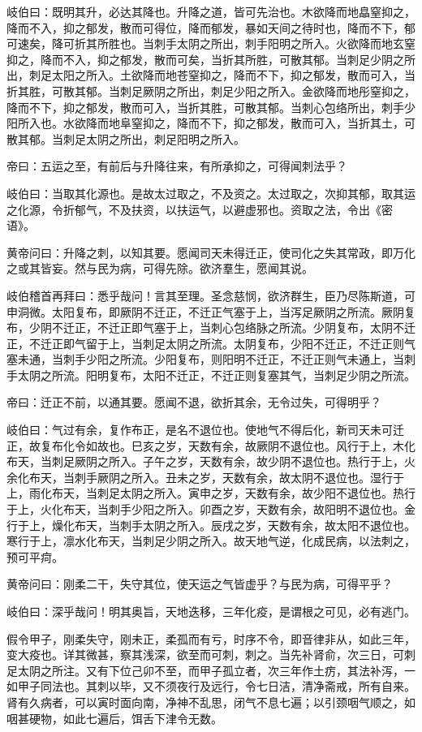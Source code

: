 \documentclass{article}%
\begin{document}
岐伯曰：既明其升，必达其降也。升降之道，皆可先治也。木欲降而地皛窒抑之，降而不入，抑之郁发，散而可得位，降而郁发，暴如天间之待时也，降而不下，郁可速矣，降可折其所胜也。当刺手太阴之所出，刺手阳明之所入。火欲降而地玄窒抑之，降而不入，抑之郁发，散而可矣，当折其所胜，可散其郁。当刺足少阴之所出，刺足太阳之所入。土欲降而地苍窒抑之，降而不下，抑之郁发，散而可入，当折其胜，可散其郁。当刺足厥阴之所出，刺足少阳之所入。金欲降而地彤窒抑之，降而不下，抑之郁发，散而可入，当折其胜，可散其郁。当刺心包络所出，刺手少阳所入也。水欲降而地阜窒抑之，降而不下，抑之郁发，散而可入，当折其土，可散其郁。当刺足太阴之所出，刺足阳明之所入。

帝曰：五运之至，有前后与升降往来，有所承抑之，可得闻刺法乎？

岐伯曰：当取其化源也。是故太过取之，不及资之。太过取之，次抑其郁，取其运之化源，令折郁气，不及扶资，以扶运气，以避虚邪也。资取之法，令出《密语》。

黄帝问曰：升降之刺，以知其要。愿闻司天未得迁正，使司化之失其常政，即万化之或其皆妄。然与民为病，可得先除。欲济羣生，愿闻其说。

岐伯稽首再拜曰：悉乎哉问！言其至理。圣念慈悯，欲济群生，臣乃尽陈斯道，可申洞微。太阳复布，即厥阴不迁正，不迁正气塞于上，当泻足厥阴之所流。厥阴复布，少阴不迁正，不迁正即气塞于上，当刺心包络脉之所流。少阴复布，太阴不迁正，不迁正即气留于上，当刺足太阴之所流。太阴复布，少阳不迁正，不迁正则气塞未通，当刺手少阳之所流。少阳复布，则阳明不迁正，不迁正则气未通上，当刺手太阴之所流。阳明复布，太阳不迁正，不迁正则复塞其气，当刺足少阴之所流。

帝曰：迁正不前，以通其要。愿闻不退，欲折其余，无令过失，可得明乎？

岐伯曰：气过有余，复作布正，是名不退位也。使地气不得后化，新司天未可迁正，故复布化令如故也。巳亥之岁，天数有余，故厥阴不退位也。风行于上，木化布天，当刺足厥阴之所入。子午之岁，天数有余，故少阴不退位也。热行于上，火余化布天，当刺手厥阴之所入。丑未之岁，天数有余，故太阴不退位也。湿行于上，雨化布天，当刺足太阴之所入。寅申之岁，天数有余，故少阳不退位也。热行于上，火化布天，当刺手少阳之所入。卯酉之岁，天数有余，故阳明不退位也。金行于上，燥化布天，当刺手太阴之所入。辰戌之岁，天数有余，故太阳不退位也。寒行于上，凛水化布天，当刺足少阴之所入。故天地气逆，化成民病，以法刺之，预可平疴。

黄帝问曰：刚柔二干，失守其位，使天运之气皆虚乎？与民为病，可得平乎？

岐伯曰：深乎哉问！明其奥旨，天地迭移，三年化疫，是谓根之可见，必有逃门。

假令甲子，刚柔失守，刚未正，柔孤而有亏，时序不令，即音律非从，如此三年，变大疫也。详其微甚，察其浅深，欲至而可刺，刺之。当先补肾俞，次三日，可刺足太阴之所注。又有下位己卯不至，而甲子孤立者，次三年作土疠，其法补泻，一如甲子同法也。其刺以毕，又不须夜行及远行，令七日洁，清净斋戒，所有自来。肾有久病者，可以寅时面向南，净神不乱思，闭气不息七遍；以引颈咽气顺之，如咽甚硬物，如此七遍后，饵舌下津令无数。
\end{document}
